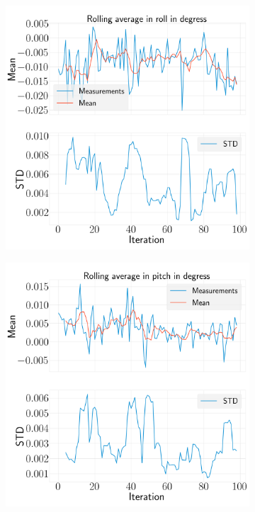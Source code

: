\documentclass[../Head/report.tex]{subfiles}
\begin{document}
\begin{figure}[H]
    \centering
    \begin{subfigure}[t]{.30\textwidth}
        \centering
        \includegraphics[width=\textwidth]{../Figures/analyse_rolling_average/test1/Calculated_rolling_average_in_roll_with_mean_and_STD.png}
        \caption{}
        \label{fig:GPS2Vision_pose_estimation_test2_roll}
    \end{subfigure}
     \hspace{0.2em}
    \begin{subfigure}[t]{.30\textwidth}
        \centering
        \includegraphics[width=\textwidth]{../Figures/analyse_rolling_average/test1/Calculated_rolling_average_in_pitch_with_mean_and_STD.png}

\end{subfigure}
\end{figure}
\end{document}
